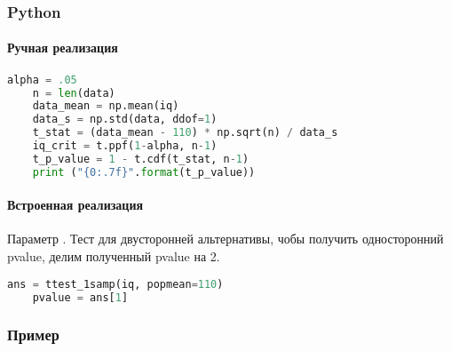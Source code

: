 \subsubsection*{Python}\label{cha:1sample/sec:mo/subsec:ttest/subsubsec:python}

\paragraph*{Ручная реализация}

\begin{lstlisting}[language=Python]
	alpha = .05
	n = len(data)
	data_mean = np.mean(iq)
	data_s = np.std(data, ddof=1)
	t_stat = (data_mean - 110) * np.sqrt(n) / data_s
	iq_crit = t.ppf(1-alpha, n-1)
	t_p_value = 1 - t.cdf(t_stat, n-1)
	print ("{0:.7f}".format(t_p_value))
\end{lstlisting}

\paragraph*{Встроенная реализация}

Параметр . Тест для двусторонней альтернативы, чобы получить односторонний pvalue, делим полученный pvalue на 2.

\begin{lstlisting}[language=Python]
	ans = ttest_1samp(iq, popmean=110)
	pvalue = ans[1]
\end{lstlisting}

\subsubsection*{Пример}\label{cha:1sample/sec:ttest/subsec:python}

